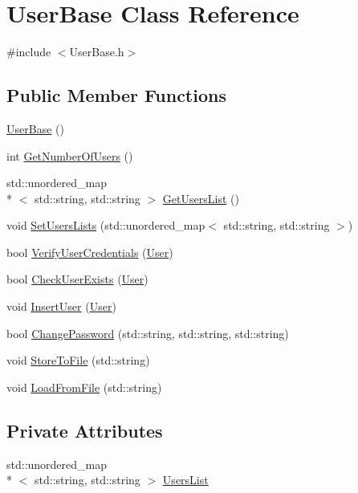 \hypertarget{classUserBase}{\section{User\-Base Class Reference}
\label{classUserBase}
}


{\ttfamily \#include $<$User\-Base.\-h$>$}

\subsection*{Public Member Functions}
\begin{DoxyCompactItemize}
\item 
\hyperlink{classUserBase_aef178f4f3fd2a97b6221c0ec92c675ae}{User\-Base} ()
\item 
int \hyperlink{classUserBase_a9515e2d3cf822f06641900bb37d997e3}{Get\-Number\-Of\-Users} ()
\item 
std\-::unordered\-\_\-map\\*
$<$ std\-::string, std\-::string $>$ \hyperlink{classUserBase_adcb3f5b10e4889d27285813f8f38c893}{Get\-Users\-List} ()
\item 
void \hyperlink{classUserBase_ac008fbb031432046c7ca431d934301e7}{Set\-Users\-Lists} (std\-::unordered\-\_\-map$<$ std\-::string, std\-::string $>$)
\item 
bool \hyperlink{classUserBase_acc5731f7347d1844a43e761ebe42006f}{Verify\-User\-Credentials} (\hyperlink{classUser}{User})
\item 
bool \hyperlink{classUserBase_ab8a35f8cadaeb61010db846b4fc042f2}{Check\-User\-Exists} (\hyperlink{classUser}{User})
\item 
void \hyperlink{classUserBase_a20daf1309f8151cec9ac8f7f4203bd40}{Insert\-User} (\hyperlink{classUser}{User})
\item 
bool \hyperlink{classUserBase_a1be56d6f223cd39a6fdaba3d1888f19e}{Change\-Password} (std\-::string, std\-::string, std\-::string)
\item 
void \hyperlink{classUserBase_ac9d7a05e0345ef040df653ee0fed6224}{Store\-To\-File} (std\-::string)
\item 
void \hyperlink{classUserBase_aebca8f40b615194c576ef041668b9726}{Load\-From\-File} (std\-::string)
\end{DoxyCompactItemize}
\subsection*{Private Attributes}
\begin{DoxyCompactItemize}
\item 
std\-::unordered\-\_\-map\\*
$<$ std\-::string, std\-::string $>$ \hyperlink{classUserBase_a6e9f1eff5be41e7a37e50b8281270266}{Users\-List}
\end{DoxyCompactItemize}


